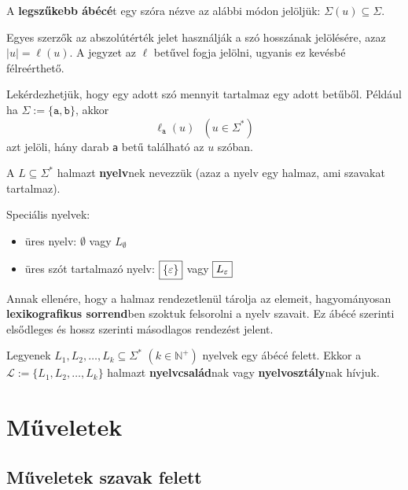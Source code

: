A \textbf{legszűkebb ábécé}t egy szóra nézve az alábbi módon jelöljük: $\Sigma(u) \subseteq \Sigma$.

Egyes szerzők az abszolútérték jelet használják a szó hosszának jelölésére, azaz $|u| = \ell(u)$. A jegyzet az $\ell$ betűvel fogja jelölni, ugyanis ez kevésbé félreérthető.

Lekérdezhetjük, hogy egy adott szó mennyit tartalmaz egy adott betűből. Például ha $ \Sigma := \{ \texttt{a}, \texttt{b} \} $, akkor \[ \ell_\texttt{a}(u) ~~~ (u \in \Sigma^*)\] azt jelöli, hány darab \texttt{a} betű található az $u$ szóban.
\begin{tcolorbox}
	\begin{definition}[Nyelv]
		A $L \subseteq \Sigma^*$ halmazt \textbf{nyelv}nek nevezzük (azaz a nyelv egy halmaz, ami szavakat tartalmaz).
	\end{definition}
\end{tcolorbox}


Speciális nyelvek:
\begin{itemize}
	\item üres nyelv: $\boxed{\emptyset}$ vagy $\boxed{L_\emptyset}$
	\item üres szót tartalmazó nyelv: $\boxed{\{\varepsilon\}}$ vagy $\boxed{L_\varepsilon}$
\end{itemize}

Annak ellenére, hogy a halmaz rendezetlenül tárolja az elemeit, hagyományosan \textbf{lexikografikus sorrend}ben szoktuk felsorolni a nyelv szavait. Ez ábécé szerinti elsődleges és hossz szerinti másodlagos rendezést jelent.

\begin{tcolorbox}
	\begin{definition}[Nyelvcsalád]
		Legyenek $L_1, L_2, \dots, L_k \subseteq \Sigma^*$ $(k \in \mathbb{N}^+)$ nyelvek egy ábécé felett. Ekkor a $\mathcal{L} := \{ L_1, L_2, \dots, L_k \}$ halmazt \textbf{nyelvcsalád}nak vagy \textbf{nyelvosztály}nak hívjuk.
	\end{definition}
\end{tcolorbox}

\section{Műveletek}

\subsection{Műveletek szavak felett}

